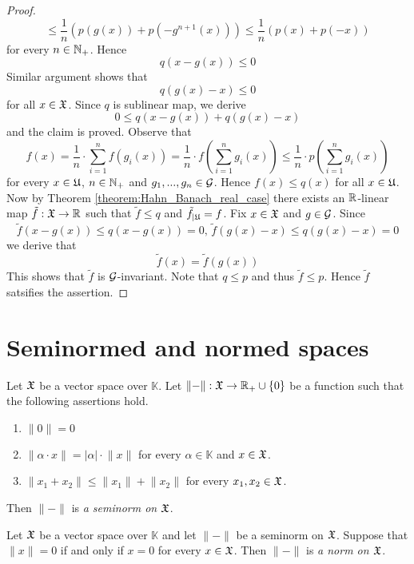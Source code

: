 \begin{proof}
   $$\leq \frac{1}{n}\left(p\left(g(x)\right) + p\left(-g^{n+1}(x)\right)\right) \leq \frac{1}{n}\left(p(x) + p(-x)\right)$$
   for every $n\in {\mathbb N}_+$. Hence
   $$q\left(x - g(x)\right) \leq 0$$
   Similar argument shows that
   $$q\left(g(x) - x\right) \leq 0$$
   for all $x \in {\mathfrak X}$. Since $q$ is sublinear map, we derive
   $$0 \leq q\left(x - g(x)\right) + q\left(g(x) - x\right)$$
   and the claim is proved. Observe that
   $$f(x) = \frac{1}{n}\cdot \sum_{i=1}^nf\left(g_i(x)\right) = \frac{1}{n}\cdot f\left(\sum_{i=1}^ng_i(x)\right) \leq \frac{1}{n}\cdot p\left(\sum_{i=1}^ng_i(x)\right)$$
   for every $x \in {\mathfrak U}$, $n\in {\mathbb N}_+$ and $g_1,...,g_n\in {\mathcal G}$. Hence $f(x) \leq q(x)$ for all $x\in {\mathfrak U}$. Now by Theorem \ref{theorem:Hahn_Banach_real_case} there exists an ${\mathbb R}$-linear map $\tilde{f}:{\mathfrak X}\rightarrow {\mathbb R}$ such that $\tilde{f} \leq q$ and $\tilde{f}_{\mid {\mathfrak U}} = f$. Fix $x \in {\mathfrak X}$ and $g \in {\mathcal G}$. Since
   $$\tilde{f}\left(x - g(x)\right) \leq q\left(x - g(x)\right) = 0,\,\tilde{f}\left(g(x) - x\right) \leq q\left(g(x) - x\right) = 0$$
   we derive that
   $$\tilde{f}(x) = \tilde{f}\left(g(x)\right)$$
   This shows that $\tilde{f}$ is ${\mathcal G}$-invariant. Note that $q \leq p$ and thus $\tilde{f} \leq p$. Hence $\tilde{f}$ satsifies the assertion.
\end{proof}



\section{Seminormed and normed spaces}

\begin{definition}
   Let ${\mathfrak X}$ be a vector space over $\mathbb{K}$. Let $\lVert-\rVert:{\mathfrak X} \rightarrow {\mathbb R}_+ \cup \{0\}$ be a function such that the following assertions hold.
   \begin{enumerate}[label=\textbf{(\arabic*)}, leftmargin=*]
      \item $\lVert 0 \rVert = 0$
      \item $\lVert \alpha \cdot x\rVert = |\alpha|\cdot \lVert x\rVert$ for every $\alpha \in \mathbb{K}$ and $x \in {\mathfrak X}$.
      \item $\lVert x_1 + x_2 \rVert \leq \lVert x_1 \rVert + \lVert x_2 \rVert$ for every $x_1,x_2 \in {\mathfrak X}$.
   \end{enumerate}
   Then $\lVert-\rVert$ is \textit{a seminorm on ${\mathfrak X}$}.
\end{definition}

\begin{definition}
   Let ${\mathfrak X}$ be a vector space over $\mathbb{K}$ and let $\lVert - \rVert$ be a seminorm on ${\mathfrak X}$. Suppose that $\lVert x \rVert = 0$ if and only if $x = 0$ for every $x \in {\mathfrak X}$. Then $\lVert - \rVert$ is \textit{a norm on ${\mathfrak X}$}.
\end{definition}

